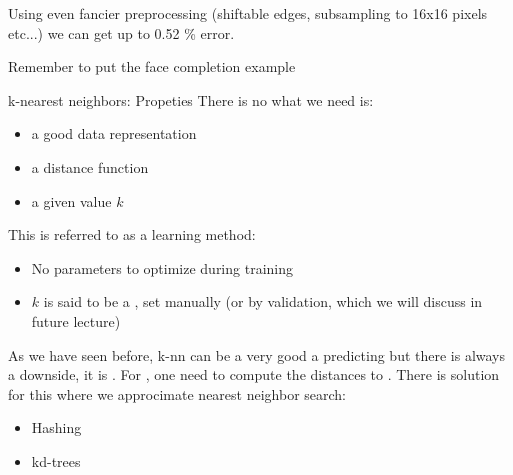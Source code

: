 	Using even fancier preprocessing (shiftable edges, subsampling to 16x16 pixels etc...) we can get up to 0.52 \% error.
	\begin{framedremark}
	Remember to put the face completion example
	\end{framedremark}
	\begin{parag}{k-nearest neighbors: Propeties}
	    There is no  what we need is:
		\begin{itemize}
			\item a good data representation
			\item a distance function
			\item a given value $k$
		\end{itemize}
		This is referred to as a  learning method:
		\begin{itemize}
		    \item No parameters to optimize during training
		    \item $k$ is said to be a , set manually (or by validation, which we will discuss in future lecture)
		\end{itemize}
		As we have seen before, k-nn can be a very good a predicting but there is always a downside, it is . For , one need to compute the distances to . There is solution for this where we approcimate nearest neighbor search:
		\begin{itemize}
		    \item Hashing
		    \item kd-trees
		\end{itemize}
	\end{parag}
